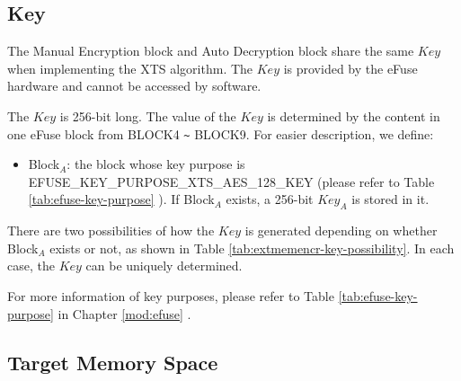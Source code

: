 \documentclass[main\_\_EN.tex]{subfiles}
\begin{document}
\subsection{Key}
\label{sec:extmemncr-key}

The Manual Encryption block and Auto Decryption block share the same \begin{math}\mathit{Key}\end{math} when implementing the XTS algorithm. The \begin{math}\mathit{Key}\end{math} is provided by the eFuse hardware and cannot be accessed by software.

The \begin{math}\mathit{Key}\end{math} is 256-bit long. The value of the \begin{math}\mathit{Key}\end{math} is determined by the content in one eFuse block from BLOCK4 \verb+~+ BLOCK9. For easier description, we define:
\begin{itemize}
\item Block$_A$: the block whose key purpose is EFUSE\_KEY\_PURPOSE\_XTS\_AES\_128\_KEY (please refer to Table \ref{tab:efuse-key-purpose} \textit{}). If Block$_A$ exists, a 256-bit \begin{math}\mathit{Key}_{A}\end{math} is stored in it.
\end{itemize}

There are two possibilities of how the \begin{math}\mathit{Key}\end{math} is generated depending on whether Block$_A$ exists or not, as shown in Table \ref{tab:extmemencr-key-possibility}. In each case, the \begin{math}\mathit{Key}\end{math} can be uniquely determined.



For more information of key purposes, please refer to Table \ref{tab:efuse-key-purpose} \textit{} in Chapter \ref{mod:efuse} \textit{}.

\subsection{Target Memory Space}
\label{sec:extmemencr-target-space}
\end{document}
